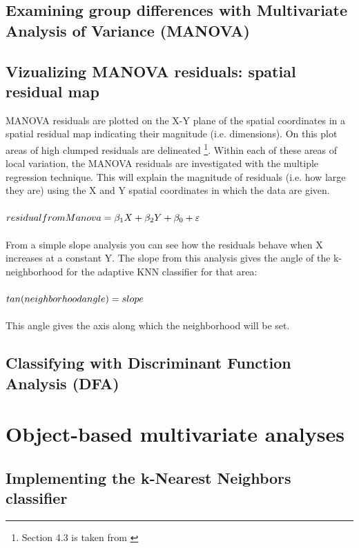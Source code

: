 \documentclass {article}
\begin{document}
\subsection {Examining group differences with Multivariate Analysis of Variance (MANOVA)}

\subsection {Vizualizing MANOVA residuals: spatial residual map}

MANOVA residuals are plotted on the X-Y plane of the spatial coordinates in a spatial residual map indicating their magnitude (i.e. dimensions). On this plot areas of high clumped residuals are delineated \footnote {Section 4.3 is taken from \cite{tesileanu_geostatistics_2017}}.  
Within each of these areas of local variation, the MANOVA residuals are investigated with the multiple regression technique. This will explain the magnitude of residuals (i.e. how large they are) using the X and Y spatial coordinates in which the data are given.
\\
\\
$residual\underline{\space}from\underline{\space}Manova = \beta_1 X + \beta_2 Y + \beta_0 + \varepsilon$
\\
\\
From a simple slope analysis you can see how the residuals behave when X increases at a constant Y.
 The slope from this analysis gives the angle of the k-neighborhood for the adaptive KNN classifier for that area:
\\
\\
$ tan(neighborhood\underline{\space}angle) = slope $
\\
\\
This angle gives the axis along which the neighborhood will be set.
 

\subsection {Classifying with Discriminant Function Analysis (DFA)}


\section {Object-based multivariate analyses}

\subsection{ Implementing the k-Nearest Neighbors classifier}
\end{document}
